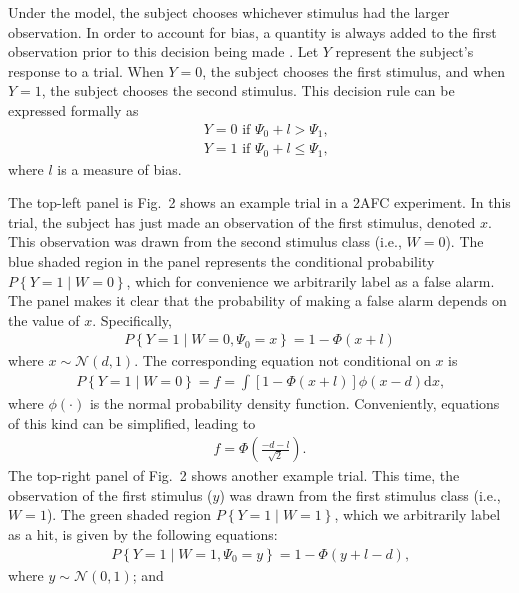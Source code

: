 \documentclass[man]{apa6}
\begin{document}
Under the model, the subject chooses whichever stimulus had the larger observation. In order to account for bias, a quantity is always added to the first observation prior to this decision being made \parencite[see][]{decarloon2012}. Let $Y$ represent the subject's response to a trial. When $Y=0$, the subject chooses the first stimulus, and when $Y=1$, the subject chooses the second stimulus. This decision rule can be expressed formally as
\begin{eqnarray*}
&Y=0\textrm{ if }\Psi_0+l>\Psi_1\textrm{,}\\
&Y=1\textrm{ if }\Psi_0+l\le\Psi_1\textrm{,}
\end{eqnarray*}where $l$ is a measure of bias.

The top-left panel is Fig.~2 shows an example trial in a 2AFC experiment. In this trial, the subject has just made an observation of the first stimulus, denoted $x$. This observation was drawn from the second stimulus class (i.e., $W=0$). The blue shaded region in the panel represents the conditional probability $P\left\{Y=1\mid{}W=0\right\}$, which for convenience we arbitrarily label as a false alarm. The panel makes it clear that the probability of making a false alarm depends on the value of $x$. Specifically,
\begin{eqnarray*}
P\left\{Y=1\mid{}W=0,\Psi_0=x\right\}=1-\Phi\left(x+l\right)
\end{eqnarray*} where $x\sim\mathcal{N}\left(d,1\right)$. The corresponding equation not conditional on $x$ is
\begin{eqnarray*}
P\left\{Y=1\mid{}W=0\right\}=f=\int\!\left[1-\Phi\left(x+l\right)\right]\phi\left(x-d\right)\textrm{d}x\textrm{,}
\end{eqnarray*} where $\phi\left(\cdot\right)$ is the normal probability density function. Conveniently, equations of this kind can be simplified, leading to
\begin{eqnarray*}
f=\Phi\left(\frac{-d-l}{\sqrt{2}}\right)\textrm{.}
\end{eqnarray*}
The top-right panel of Fig.~2 shows another example trial. This time, the observation of the first stimulus ($y$) was drawn from the first stimulus class (i.e., $W=1$). The green shaded region $P\left\{Y=1\mid{}W=1\right\}$, which we arbitrarily label as a hit, is given by the following equations:
\begin{eqnarray*}
P\left\{Y=1\mid{}W=1,\Psi_0=y\right\}=1-\Phi\left(y+l-d\right)\textrm{,}
\end{eqnarray*} where $y\sim\mathcal{N}\left(0,1\right)$; and
\end{document}
